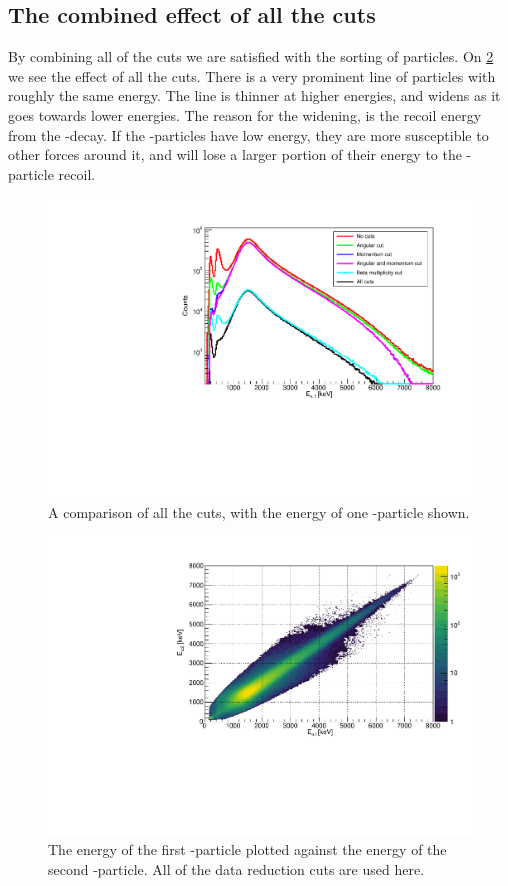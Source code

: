 \subsection{The combined effect of all the cuts}
By combining all of the cuts we are satisfied with the sorting of particles. 
On \cref{fig:EEAllCuts} we see the effect of all the cuts.
There is a very prominent line of particles with roughly the same energy. 
The line is thinner at higher energies, and widens as it goes towards lower energies. 
The reason for the widening, is the recoil energy from the \be-decay.
If the \al-particles have low energy, they are more susceptible to other forces around it, and will lose a larger portion of their energy to the \be-particle recoil. \\
\begin{figure}[h]
	\centering
	\includegraphics[width=\linewidth]{../figures/cutCompare.pdf}
	\caption{A comparison of all the cuts, with the energy of one \al-particle shown. }
	\label{fig:allCutsCompare}
\end{figure}
\begin{figure}[h]
	\centering
	\includegraphics[width=\linewidth]{../figures/EE.pdf}
	\caption{The energy of the first \al-particle plotted against the energy of the second \al-particle. All of the data reduction cuts are used here.}
	\label{fig:EEAllCuts}
\end{figure}
